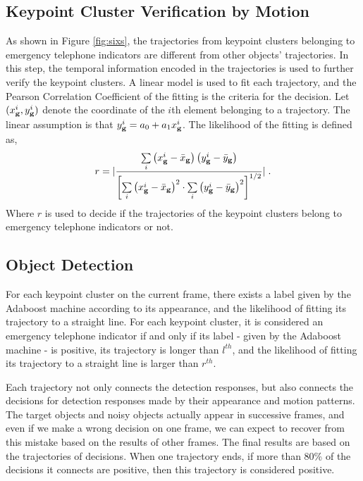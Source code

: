 \documentclass{JoITSRstyle}
\begin{document}
\subsection{Keypoint Cluster Verification by Motion}
As shown in Figure \ref{fig:sixs}, the trajectories from keypoint clusters belonging to emergency telephone indicators are different from other objects' trajectories. In this step, the temporal information encoded in the trajectories is used to further verify the keypoint clusters. A linear model is used to fit each trajectory, and the Pearson Correlation Coefficient of the fitting is the criteria for the decision. Let $(x^i_{\bf{g}},y^i_{\bf{g}})$ denote the coordinate of the $i$th element belonging to a trajectory. The linear assumption is that $y^i_{\bf{g}}=a_0+a_1{x^i_{\bf{g}}}$. The likelihood of the fitting is defined as,
\begin{equation}
r =| \frac{{\sum\limits_i {\left( {{x^i_{\bf{g}}} -  {\bar x_{\bf{g}}}} \right)\left( {{y^i_{\bf{g}}} -  {\bar y_{\bf{g}}}} \right)} }}{{{{\left[ {\sum\limits_i {{{\left( {{x^i_{\bf{g}}} -  {\bar x_{\bf{g}}}} \right)}^2} \cdot \sum\limits_i {{{\left( {{y^i_{\bf{g}}} -  {\bar y_{\bf{g}}}} \right)}^2}} } } \right]}^{1/2}}}}|\;.
\label{eq4}
\end{equation}
Where $r$ is used to decide if the trajectories of the keypoint clusters belong to emergency telephone indicators or not.
\subsection{Object Detection}
For each keypoint cluster on the current frame, there exists a label given by the Adaboost machine according to its appearance, and the likelihood of fitting its trajectory to a straight line.  For each keypoint cluster, it is considered an emergency telephone indicator if and only if its label - given by the Adaboost machine - is positive, its trajectory is longer than $l^{th}$, and the likelihood of fitting its trajectory to a straight line is larger than $r^{th}$.

Each trajectory not only connects the detection responses, but also connects the decisions for detection responses made by their appearance and motion patterns. The target objects and noisy objects actually appear in successive frames, and even if we make a wrong decision on one frame, we can expect to recover from this mistake based on the results of other frames. The final results are based on the trajectories of decisions. When one trajectory ends, if more than 80\% of the decisions it connects are positive, then this trajectory is considered positive.
\end{document}
